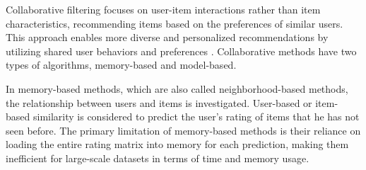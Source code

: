 \documentclass{article}
\theoremstyle{plain}
\theoremstyle{definition}
\theoremstyle{remark}
\begin{document}
Collaborative filtering focuses on user-item interactions rather than item characteristics, recommending items based on the preferences of similar users. This approach enables more diverse and personalized recommendations by utilizing shared user behaviors and preferences \cite{isinkaye2023matrix}. Collaborative methods have two types of algorithms, memory-based and model-based.

In memory-based methods, which are also called neighborhood-based methods, the relationship between users and items is investigated. User-based \cite{zhao2010user,valcarce2019collaborative} or item-based \cite{sarwar2001item,fu2018attention} similarity is considered to predict the user's rating of items that he has not seen before. The primary limitation of memory-based methods is their reliance on loading the entire rating matrix into memory for each prediction, making them inefficient for large-scale datasets in terms of time and memory usage. 
\end{document}
